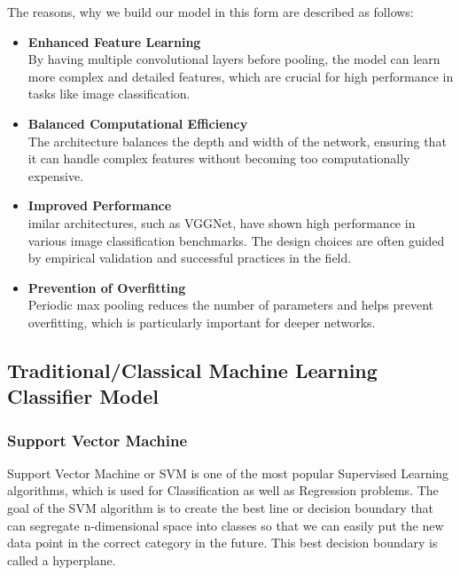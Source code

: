     The reasons, why we build our model in this form are described as follows: \\
    \begin{itemize}
        \item \textbf{Enhanced Feature Learning}\\
        By having multiple convolutional layers before pooling, the model can learn more complex and detailed features, which are crucial for high performance in tasks like image classification.
        
        \item \textbf{Balanced Computational Efficiency}\\
        The architecture balances the depth and width of the network, ensuring that it can handle complex features without becoming too computationally expensive.
        
        \item \textbf{Improved Performance}\\
        imilar architectures, such as VGGNet, have shown high performance in various image classification benchmarks. The design choices are often guided by empirical validation and successful practices in the field.
        
        \item \textbf{Prevention of Overfitting}\\
        Periodic max pooling reduces the number of parameters and helps prevent overfitting, which is particularly important for deeper networks.
        
    \end{itemize}
    

    
    \subsection{Traditional/Classical Machine Learning Classifier Model}
    
        \subsubsection{Support Vector Machine}
        Support Vector Machine or SVM is one of the most popular Supervised Learning algorithms, which is used for Classification as well as Regression problems. The goal of the SVM algorithm is to create the best line or decision boundary that can segregate n-dimensional space into classes so that we can easily put the new data point in the correct category in the future. This best decision boundary is called a hyperplane\cite{svm-0}\cite{kernel}.\par \vspace{1em}

